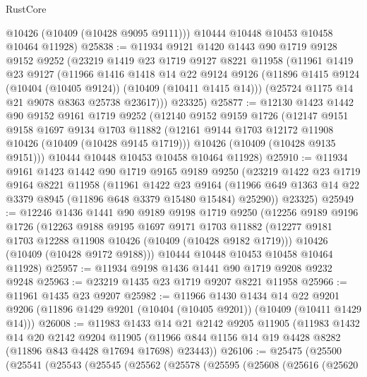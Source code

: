 \begin{lexlean}{RustCore}
\begin{coremodule}
        @10426
        (@10409 (@10428 @9095 @9111)))
      @10444
      @10448
      @10453
      @10458
      @10464
      @11928)
@25838 := @11934
    @9121
    @1420
    @1443
    @90
    @1719
    @9128
    @9152
    @9252
    (@23219
      @1419
      @23
      @1719
      @9127
      @8221
      @11958
      (@11961
        @1419
        @23
        @9127
        (@11966
          @1416
          @1418
          @14
          @22
          @9124
          @9126
          (@11896 @1415 @9124 (@10404 (@10405 @9124)) (@10409 (@10411 @1415 @14)))
          (@25724 @1175 @14 @21 @9078 @8363 @25738 @23617)))
      @23325)
@25877 := @12130
    @1423
    @1442
    @90
    @9152
    @9161
    @1719
    @9252
    (@12140
      @9152
      @9159
      @1726
      (@12147
        @9151
        @9158
        @1697
        @9134
        @1703
        @11882
        (@12161 @9144 @1703 @12172 @11908 @10426 (@10409 (@10428 @9145 @1719)))
        @10426
        (@10409 (@10428 @9135 @9151)))
      @10444
      @10448
      @10453
      @10458
      @10464
      @11928)
@25910 := @11934
    @9161
    @1423
    @1442
    @90
    @1719
    @9165
    @9189
    @9250
    (@23219
      @1422
      @23
      @1719
      @9164
      @8221
      @11958
      (@11961
        @1422
        @23
        @9164
        (@11966 @649 @1363 @14 @22 @3379 @8945 (@11896 @648 @3379 @15480 @15484) @25290))
      @23325)
@25949 := @12246
    @1436
    @1441
    @90
    @9189
    @9198
    @1719
    @9250
    (@12256
      @9189
      @9196
      @1726
      (@12263
        @9188
        @9195
        @1697
        @9171
        @1703
        @11882
        (@12277 @9181 @1703 @12288 @11908 @10426 (@10409 (@10428 @9182 @1719)))
        @10426
        (@10409 (@10428 @9172 @9188)))
      @10444
      @10448
      @10453
      @10458
      @10464
      @11928)
@25957 := @11934 @9198 @1436 @1441 @90 @1719 @9208 @9232 @9248
@25963 := @23219 @1435 @23 @1719 @9207 @8221 @11958
@25966 := @11961 @1435 @23 @9207
@25982 := @11966
    @1430
    @1434
    @14
    @22
    @9201
    @9206
    (@11896 @1429 @9201 (@10404 (@10405 @9201)) (@10409 (@10411 @1429 @14)))
@26008 := @11983
    @1433
    @14
    @21
    @2142
    @9205
    @11905
    (@11983
      @1432
      @14
      @20
      @2142
      @9204
      @11905
      (@11966 @844 @1156 @14 @19 @4428 @8282 (@11896 @843 @4428 @17694 @17698) @23443))
@26106 := @25475
    (@25500
      (@25541
        (@25543
          (@25545
            (@25562
              (@25578
                (@25595
                  (@25608
                    (@25616
                      (@25620

\end{coremodule}
\end{lexlean}
